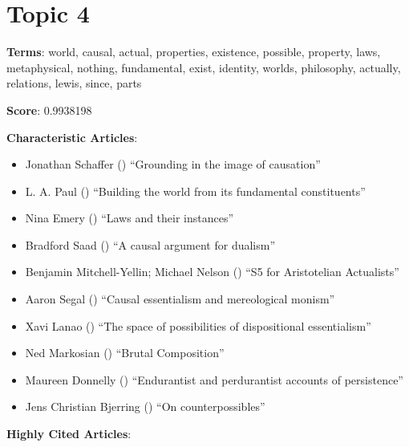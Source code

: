 \documentclass[
  10pt,
  letterpaper,
  DIV=11,
  numbers=noendperiod,
  twoside]{scrartcl}
\providecommand{\tightlist}{%
  \setlength{\itemsep}{0pt}\setlength{\parskip}{0pt}}\usepackage{longtable,booktabs,array}
\begin{document}
\section{Topic 4}\label{topic-4}

\textbf{Terms}: world, causal, actual, properties, existence, possible,
property, laws, metaphysical, nothing, fundamental, exist, identity,
worlds, philosophy, actually, relations, lewis, since, parts

\textbf{Score}: 0.9938198

\textbf{Characteristic Articles}:

\begin{itemize}
\tightlist
\item
  Jonathan Schaffer ()
  ``Grounding in the image of causation''
\item
  L. A. Paul () ``Building the
  world from its fundamental constituents''
\item
  Nina Emery
  ()
  ``Laws and their instances''
\item
  Bradford Saad () ``A causal
  argument for dualism''
\item
  Benjamin Mitchell-Yellin; Michael Nelson
  () ``S5 for Aristotelian
  Actualists''
\item
  Aaron Segal () ``Causal
  essentialism and mereological monism''
\item
  Xavi Lanao () ``The space of
  possibilities of dispositional essentialism''
\item
  Ned Markosian () ``Brutal
  Composition''
\item
  Maureen Donnelly ()
  ``Endurantist and perdurantist accounts of persistence''
\item
  Jens Christian Bjerring () ``On
  counterpossibles''
\end{itemize}

\textbf{Highly Cited Articles}:
\end{document}
